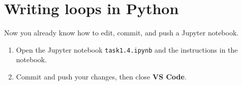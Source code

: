 \documentclass[12pt,a4paper]{article}
\begin{document}
\section{Writing loops in Python}
Now you already know how to edit, commit, and push a Jupyter notebook.
\begin{enumerate}
    \item Open the Jupyter notebook \texttt{task1.4.ipynb} and the instructions in the notebook.
    \item Commit and push your changes, then close \textbf{VS Code}.
\end{enumerate}
\end{document}
